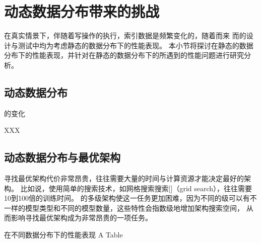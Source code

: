 \section{动态数据分布带来的挑战}

在真实情景下，伴随着写操作的执行，索引数据是频繁变化的，随着而来
而{\li}的设计与测试中均为考虑静态的数据分布下的性能表现。
本小节将探讨{\li}在静态的数据分布下的性能表现，并针对{\li}在静态的数据分布下的所遇到的性能问题进行研究分析。

\subsection{动态数据分布}

{\cdf}的变化

XXX

\subsection{动态数据分布与最优{\li}架构}

寻找最优{\li}架构代价非常昂贵，往往需要大量的时间与计算资源才能决定最好的{\li}架构。
比如说，使用简单的搜索技术，如网格搜索搜索[]（grid search），往往需要10到100倍的训练时间。
{\li}的多级架构使这一任务更加困难，因为不同的级可以有不一样的模型类型和不同的模型数量，这些特性会指数级地增加架构搜索空间，
从而影响寻找最优{\li}架构成为非常昂贵的一项任务。


% 

\begin{table}[!hpb]
  \centering
  \bicaption[指向一个表格的表目录索引]
    {{\li}在不同数据分布下的性能表现}
    {A Table}
  \label{tab:dist}
  \begin{tabular}{@{}llr@{}} \toprule
  \end{tabular}
\end{table}

